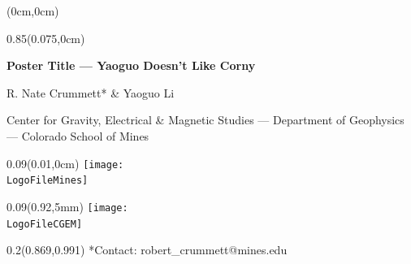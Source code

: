 \documentclass[dark]{cgem-poster}
\makeatletter
\newcommand{\PosterTitle}{Poster Title --- Yaoguo Doesn't Like Corny}
\newcommand{\PosterFirstAuthor}{R. Nate Crummett}
\newcommand{\PosterFirstAuthorContact}{robert\_crummett@mines.edu}
\newcommand{\PosterSecondAuthor}{Yaoguo Li}
\newcommand{\PosterAffiliationCGEM}{Center for Gravity, Electrical \& Magnetic Studies}
\newcommand{\PosterAffiliationMines}{Colorado School of Mines}
\newcommand{\PosterAffiliationGeophysics}{Department of Geophysics}
\makeatother
\begin{document}

\newcommand{\titleheight}{0.09\pageheight}
\newcommand{\PosterCGEMLogoHeight}{\dimexpr(\titleheight - 12mm)\relax}

\begin{textblock*}{\pagewidth}(0cm,0cm)
  \begin{minipage}[t][\titleheight{}][t]{\pagewidth}
  \end{minipage}
\end{textblock*}

\begin{textblock*}{0.85\pagewidth}(0.075\pagewidth,0cm)
  \begin{center}
    \vspace{5mm}
    \Large
    \textbf{
      \PosterTitle{}
    }
    \par
    \vspace{5mm}
    \normalsize
    { \color{PosterSubtitleColor}
    \PosterFirstAuthor{}* \& \PosterSecondAuthor{}
    \par
    \small
    \PosterAffiliationCGEM{} --- \PosterAffiliationGeophysics{} --- \PosterAffiliationMines{}
    }
  \end{center}
\end{textblock*}

\begin{textblock*}{\titleheight{}}(0.01\pagewidth,0cm)
  \centering
  \hspace*{-20.72449pt}
  \texttt{[image: \\LogoFileMines]}
\end{textblock*}

\begin{textblock*}{\titleheight{}}(0.92\pagewidth,5mm)
  \centering
  \texttt{[image: \\LogoFileCGEM]}
\end{textblock*}

\begin{textblock*}{0.2\pagewidth}(0.869\pagewidth,0.991\pageheight)
  \tiny
  { \color{PosterBackgroundColor}
  *Contact: \PosterFirstAuthorContact{}
  }
\end{textblock*}
\end{document}

